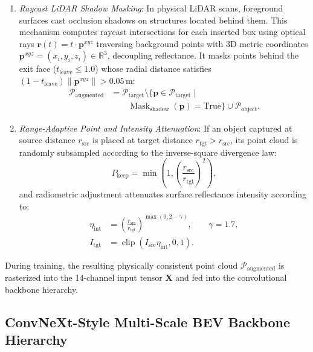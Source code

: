 \begin{enumerate}
\item \textit{Raycast LiDAR Shadow Masking}: In physical LiDAR scans, foreground surfaces cast occlusion shadows on structures located behind them. This mechanism computes raycast intersections for each inserted box using optical rays $\mathbf{r}(t) = t \cdot \mathbf{p}^{xyz}$ traversing background points with 3D metric coordinates $\mathbf{p}^{xyz} = (x_i, y_i, z_i) \in \mathbb{R}^3$, decoupling reflectance. It masks points behind the exit face ($t_{\mathrm{leave}} \le 1.0$) whose radial distance satisfies $(1 - t_{\mathrm{leave}})\|\mathbf{p}^{xyz}\| > 0.05$\,m:
\begin{equation}
    \begin{aligned}
        \mathcal{P}_{\mathrm{augmented}}
        &= \mathcal{P}_{\mathrm{target}} \setminus
        \{\mathbf{p} \in \mathcal{P}_{\mathrm{target}} \mid \\
        &\qquad \operatorname{Mask}_{\mathrm{shadow}}(\mathbf{p}) = \mathrm{True}\}
        \cup \mathcal{P}_{\mathrm{object}}.
    \end{aligned}
    \label{eq:shadow_mask}
\end{equation}

\item \textit{Range-Adaptive Point and Intensity Attenuation}: If an object captured at source distance $r_{\mathrm{src}}$ is placed at target distance $r_{\mathrm{tgt}} > r_{\mathrm{src}}$, its point cloud is randomly subsampled according to the inverse-square divergence law:
\begin{equation}
    P_{\mathrm{keep}} = \min\left(1, \left(\frac{r_{\mathrm{src}}}{r_{\mathrm{tgt}}}\right)^2\right),
    \label{eq:inverse_square}
\end{equation}
and radiometric adjustment attenuates surface reflectance intensity according to:
\[
    \begin{aligned}
        \eta_{\mathrm{int}}
        &= \left(\frac{r_{\mathrm{src}}}{r_{\mathrm{tgt}}}\right)^{\max(0, 2 - \gamma)},
        \qquad \gamma = 1.7, \\
        I_{\mathrm{tgt}}
        &= \operatorname{clip}(I_{\mathrm{src}}\eta_{\mathrm{int}}, 0, 1).
    \end{aligned}
\]
\end{enumerate}
During training, the resulting physically consistent point cloud $\mathcal{P}_{\mathrm{augmented}}$ is rasterized into the 14-channel input tensor $\mathbf{X}$ and fed into the convolutional backbone hierarchy.

\subsection{ConvNeXt-Style Multi-Scale BEV Backbone Hierarchy}
\label{sec:backbone_architecture}

